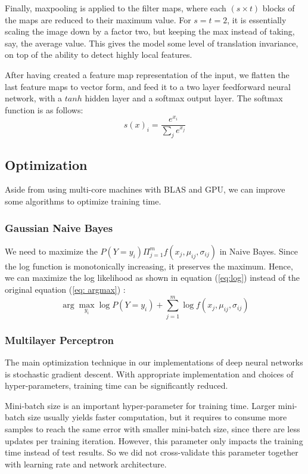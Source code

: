 \documentclass{acm_proc_article-sp}
\begin{document}
Finally, maxpooling is applied to the filter maps, where each $(s \times t)$ blocks of the maps are reduced to their maximum value. For $s=t=2$, it is essentially scaling the image down by a factor two, but keeping the max instead of taking, say, the average value. This gives the model some level of translation invariance, on top of the ability to detect highly local features.

After having created a feature map representation of the input, we flatten the last feature maps to vector form, and feed it to a two layer feedforward neural network, with a $tanh$ hidden layer and a softmax output layer. The softmax function is as follows:
\begin{equation}
s(x)_i = \frac{e^{x_i}}{\sum_j e^{x_j}} \label{eq:cnn3}
\end{equation} 


\subsection{Optimization}
Aside from using multi-core machines with BLAS and GPU, we can improve some algorithms to optimize training time. 


\subsubsection{Gaussian Naive Bayes}
We need to maximize the $P(Y = y_i) \Pi_{j=1}^m f (x_j, \mu_{ij}, \sigma_{ij} )$ in Naive Bayes. Since the log function is monotonically increasing, it preserves the maximum. Hence, we can maximize the log likelihood as shown in equation (\ref{eq:log}) instead of the original equation (\ref{eq: argmax}) :
\begin{equation}
\arg \max_{y_i} \log P(Y = y_i) + \sum_{j=1}^m \log f (x_j, \mu_{ij}, \sigma_{ij} ) \label{eq:log}
\end{equation}

\subsubsection{Multilayer Perceptron}
The main optimization technique in our implementations of deep neural networks is stochastic gradient descent. With appropriate implementation and choices of hyper-parameters, training time can be significantly reduced.

Mini-batch size is an important hyper-parameter for training time. Larger mini-batch size usually yields faster computation, but it requires to consume more samples to reach the same error with smaller mini-batch size, since there are less updates per training iteration. However, this parameter only impacts the training time instead of test results. So we did not cross-validate this parameter together with learning rate and network architecture. 
\end{document}

